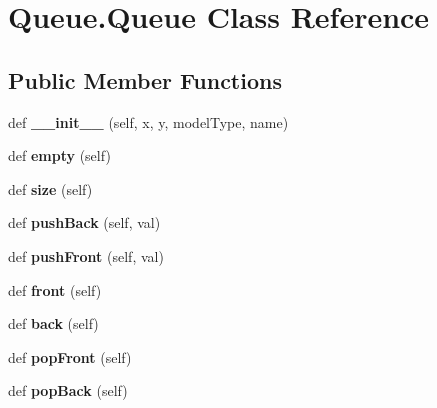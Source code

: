 \hypertarget{class_queue_1_1_queue}{}\section{Queue.\+Queue Class Reference}
\label{class_queue_1_1_queue}
\subsection*{Public Member Functions}
\begin{DoxyCompactItemize}
\item 
\mbox{\label{class_queue_1_1_queue_a775357405d27ad4bdf5ed097bee49665}} 
def {\bfseries \+\_\+\+\_\+init\+\_\+\+\_\+} (self, x, y, model\+Type, name)
\item 
\mbox{\label{class_queue_1_1_queue_a1472c6353f40c911d09da436ce8b2baa}} 
def {\bfseries empty} (self)
\item 
\mbox{\label{class_queue_1_1_queue_a478b93022acfd9225f15868f5eda0410}} 
def {\bfseries size} (self)
\item 
\mbox{\label{class_queue_1_1_queue_a6333268eb174c6fda6f9574e951710b2}} 
def {\bfseries push\+Back} (self, val)
\item 
\mbox{\label{class_queue_1_1_queue_a17b55e82b5a8db529ff6a23a6b14bb03}} 
def {\bfseries push\+Front} (self, val)
\item 
\mbox{\label{class_queue_1_1_queue_a7d3ec12e83314c6a109e8403b9250c30}} 
def {\bfseries front} (self)
\item 
\mbox{\label{class_queue_1_1_queue_ab49a295f4ebc449e5830119085493614}} 
def {\bfseries back} (self)
\item 
\mbox{\label{class_queue_1_1_queue_aa2cd3a51ee6600ca226f7c43623d6ede}} 
def {\bfseries pop\+Front} (self)
\item 
\mbox{\label{class_queue_1_1_queue_a192c71ff5839f8b1970976eefaaec777}} 
def {\bfseries pop\+Back} (self)
\end{DoxyCompactItemize}
